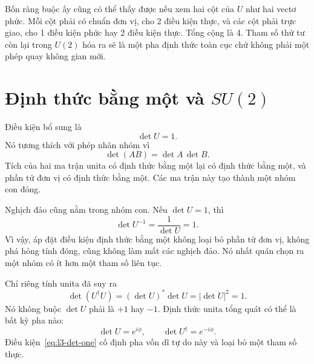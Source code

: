 Bốn ràng buộc ấy cũng có thể thấy được nếu xem hai cột của \(U\) như
hai vectơ phức. Mỗi cột phải có chuẩn đơn vị, cho 2 điều kiện thực,
và các cột phải trực giao, cho 1 điều kiện phức hay 2 điều kiện thực.
Tổng cộng là 4. Tham số thứ tư còn lại trong
\(U(2)\) hóa ra sẽ là một pha định thức toàn cục chứ không phải một phép quay không gian mới.

\section{Định thức bằng một và \texorpdfstring{\(SU(2)\)}{SU(2)}}

Điều kiện bổ sung là
\begin{equation}
\det U=1.
\label{eq:l3-det-one}
\end{equation}
Nó tương thích với phép nhân nhóm vì
\begin{equation}
\det(AB)=\det A\,\det B.
\end{equation}
Tích của hai ma trận unita có định thức bằng một lại có định thức bằng một,
và phần tử đơn vị có định thức bằng một. Các ma trận này tạo thành một nhóm con đóng.

Nghịch đảo cũng nằm trong nhóm con. Nếu \(\det U=1\), thì
\begin{equation}
\det U^{-1}=\frac{1}{\det U}=1.
\end{equation}
Vì vậy, áp đặt điều kiện định thức bằng một không loại bỏ phần tử đơn vị,
không phá hỏng tính đóng, cũng không làm mất các nghịch đảo. Nó nhất quán chọn ra một nhóm có ít hơn một tham số liên tục.

Chỉ riêng tính unita đã suy ra
\begin{equation}
\det(U^\dagger U)=
(\det U)^*\det U
=|\det U|^2=1.
\end{equation}
Nó không buộc \(\det U\) phải là \(+1\) hay \(-1\). Định thức unita tổng quát
có thể là bất kỳ pha nào:
\begin{equation}
\det U=e^{i\phi},
\qquad
\det U^\dagger=e^{-i\phi}.
\end{equation}
Điều kiện~\eqref{eq:l3-det-one} cố định pha vốn dĩ tự do này và loại bỏ một
tham số thực.

\begin{classroomqa}
\end{classroomqa}

